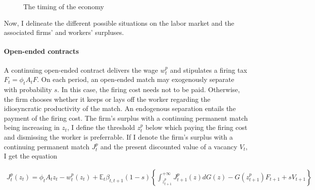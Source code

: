 \begin{figure}[H]
\begin{center}
\end{center}
\label{fig:timing}
\caption{The timing of the economy}
\end{figure}

Now, I delineate the different possible situations on the labor market and the associated firms' and workers' surpluses.

\paragraph{Open-ended contracts}

A continuing open-ended contract delivers the wage $w_{t}^{p}$ and stipulates a firing tax $F_t = \phi_t A_t F$. On each period, an open-ended match may exogenously separate with probability $s$. In this case, the firing cost needs not to be paid. Otherwise, the firm chooses whether it keeps or lays off the worker regarding the idiosyncratic productivity of the match. An endogenous separation entails the payment of the firing cost. The firm's surplus with a continuing permanent match being increasing in $z_t$, I define the threshold $z_t^p$ below which paying the firing cost and dismissing the worker is preferrable. If I denote the firm's surplus with a continuing permanent match $J_t^p$ and the present discounted value of a vacancy $V_t$, I get the equation

\begin{align} \label{eq:def_jp}
J_t^p \left( z_{t} \right) = \phi_t A_t z_{t} - w_{t}^{p} \left( z_t \right) + \mathbb{E}_{t} \beta_{t,t+1} (1-s) \left\{ \int_{z_{t+1}^p}^{+\infty} J_{t+1}^{p} \left( z \right) dG(z) - G\left(z_{t+1}^p\right) F_{t+1} + s V_{t+1} \right\}
\end{align}

